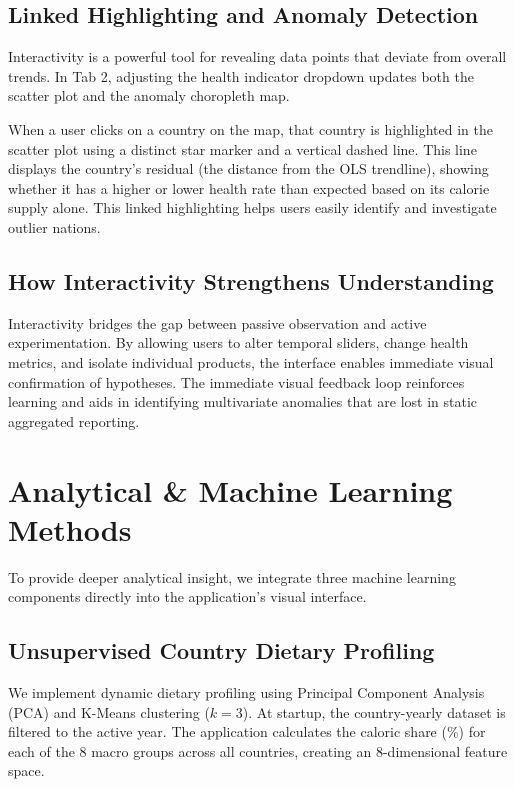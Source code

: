 \documentclass[10pt, a4paper]{article}
\begin{document}
\subsection{Linked Highlighting and Anomaly Detection}
Interactivity is a powerful tool for revealing data points that deviate from overall trends. In Tab 2, adjusting the health indicator dropdown updates both the scatter plot and the anomaly choropleth map.

When a user clicks on a country on the map, that country is highlighted in the scatter plot using a distinct star marker and a vertical dashed line. This line displays the country's residual (the distance from the OLS trendline), showing whether it has a higher or lower health rate than expected based on its calorie supply alone. This linked highlighting helps users easily identify and investigate outlier nations.

\subsection{How Interactivity Strengthens Understanding}
Interactivity bridges the gap between passive observation and active experimentation. By allowing users to alter temporal sliders, change health metrics, and isolate individual products, the interface enables immediate visual confirmation of hypotheses. The immediate visual feedback loop reinforces learning and aids in identifying multivariate anomalies that are lost in static aggregated reporting.

\section{Analytical \& Machine Learning Methods}
\label{sec:ml}

To provide deeper analytical insight, we integrate three machine learning components directly into the application's visual interface.

\subsection{Unsupervised Country Dietary Profiling}
We implement dynamic dietary profiling using Principal Component Analysis (PCA) and K-Means clustering ($k=3$). At startup, the country-yearly dataset is filtered to the active year. The application calculates the caloric share (\%) for each of the 8 macro groups across all countries, creating an 8-dimensional feature space.
\end{document}
